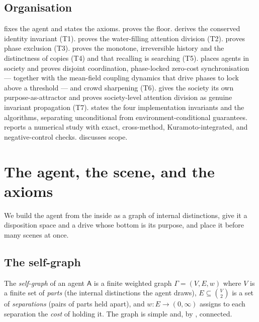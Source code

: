 \documentclass[11pt,twocolumn,a4paper]{article}
\newcommand{\Agent}{\mathsf{A}}
\newcommand{\Self}{\Gamma}          %
\newcommand{\V}{V}
\newcommand{\E}{E}
\newcommand{\wt}{w}
\begin{document}
\subsection{Organisation}

 fixes the agent and states the axioms.
 proves the floor.  derives the
conserved identity invariant (T1).  proves the
water-filling attention division (T2).  proves phase
exclusion (T3).  proves the monotone, irreversible
history and the distinctness of copies (T4) and that recalling is
searching (T5).  places agents in society and proves
disjoint coordination, phase-locked zero-cost synchronisation --- together
with the mean-field coupling dynamics that drive phases to lock above a
threshold --- and crowd sharpening (T6).  gives
the society its own purpose-as-attractor and proves society-level attention
division as genuine invariant propagation (T7).  states
the four implementation invariants and the algorithms, separating
unconditional from environment-conditional guarantees.
 reports a numerical study with exact, cross-method,
Kuramoto-integrated, and negative-control checks. 
discusses scope.

\section{The agent, the scene, and the axioms}
\label{sec:setting}

We build the agent from the inside as a graph of internal distinctions,
give it a disposition space and a drive whose bottom is its purpose, and
place it before many scenes at once.

\subsection{The self-graph}

\begin{definition}
\label{def:selfgraph}
The \emph{self-graph} of an agent $\Agent$ is a finite weighted graph
$\Self=(\V,\E,\wt)$ where $\V$ is a finite set of \emph{parts} (the
internal distinctions the agent draws), $\E\subseteq\binom{\V}{2}$ is a
set of \emph{separations} (pairs of parts held apart), and
$\wt:\E\to(0,\infty)$ assigns to each separation the \emph{cost} of
holding it. The graph is simple and, by , connected.
\end{definition}
\end{document}
